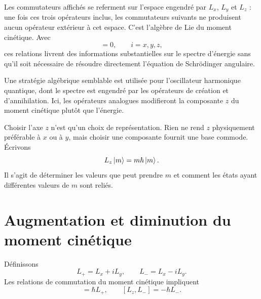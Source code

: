 Les commutateurs affichés se referment sur l’espace engendré par \(L_x\), \(L_y\) et \(L_z\) : une fois ces trois opérateurs inclus, les commutateurs suivants ne produisent aucun opérateur extérieur à cet espace. C’est l’algèbre de Lie du moment cinétique. Avec
\begin{equation}
[H,L_i]=0,
\qquad i=x,y,z,
\end{equation}
ces relations livrent des informations substantielles sur le spectre d’énergie sans qu’il soit nécessaire de résoudre directement l’équation de Schr\"odinger angulaire.

Une stratégie algébrique semblable est utilisée pour l’oscillateur harmonique quantique, dont le spectre est engendré par les opérateurs de création et d’annihilation. Ici, les opérateurs analogues modifieront la composante \(z\) du moment cinétique plutôt que l’énergie.

Choisir l’axe \(z\) n’est qu’un choix de représentation. Rien ne rend \(z\) physiquement préférable à \(x\) ou à \(y\), mais choisir une composante fournit une base commode. Écrivons
\begin{equation}
L_z\left\lvert m\right\rangle=m\hbar\left\lvert m\right\rangle.
\end{equation}
Il s’agit de déterminer les valeurs que peut prendre \(m\) et comment les états ayant différentes valeurs de \(m\) sont reliés.

\begin{classroomqa}
\end{classroomqa}

\section{Augmentation et diminution du moment cinétique}

Définissons
\begin{equation}
L_+=L_x+iL_y,
\qquad
L_-=L_x-iL_y.
\end{equation}
Les relations de commutation du moment cinétique impliquent
\begin{equation}
[L_z,L_+]=\hbar L_+,
\qquad
[L_z,L_-]=-\hbar L_-.
\end{equation}


